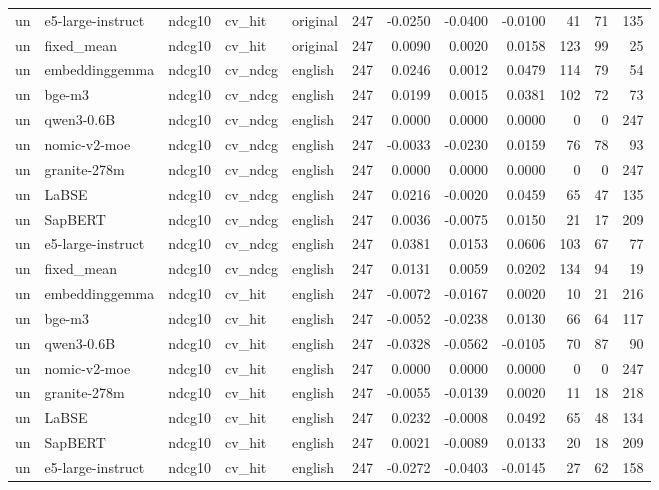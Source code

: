 \begin{tabular}{lllllrrrrrrr}
un & e5-large-instruct & ndcg10 & cv\_hit & original & 247 & -0.0250 & -0.0400 & -0.0100 & 41 & 71 & 135 \\
un & fixed\_mean & ndcg10 & cv\_hit & original & 247 & 0.0090 & 0.0020 & 0.0158 & 123 & 99 & 25 \\
un & embeddinggemma & ndcg10 & cv\_ndcg & english & 247 & 0.0246 & 0.0012 & 0.0479 & 114 & 79 & 54 \\
un & bge-m3 & ndcg10 & cv\_ndcg & english & 247 & 0.0199 & 0.0015 & 0.0381 & 102 & 72 & 73 \\
un & qwen3-0.6B & ndcg10 & cv\_ndcg & english & 247 & 0.0000 & 0.0000 & 0.0000 & 0 & 0 & 247 \\
un & nomic-v2-moe & ndcg10 & cv\_ndcg & english & 247 & -0.0033 & -0.0230 & 0.0159 & 76 & 78 & 93 \\
un & granite-278m & ndcg10 & cv\_ndcg & english & 247 & 0.0000 & 0.0000 & 0.0000 & 0 & 0 & 247 \\
un & LaBSE & ndcg10 & cv\_ndcg & english & 247 & 0.0216 & -0.0020 & 0.0459 & 65 & 47 & 135 \\
un & SapBERT & ndcg10 & cv\_ndcg & english & 247 & 0.0036 & -0.0075 & 0.0150 & 21 & 17 & 209 \\
un & e5-large-instruct & ndcg10 & cv\_ndcg & english & 247 & 0.0381 & 0.0153 & 0.0606 & 103 & 67 & 77 \\
un & fixed\_mean & ndcg10 & cv\_ndcg & english & 247 & 0.0131 & 0.0059 & 0.0202 & 134 & 94 & 19 \\
un & embeddinggemma & ndcg10 & cv\_hit & english & 247 & -0.0072 & -0.0167 & 0.0020 & 10 & 21 & 216 \\
un & bge-m3 & ndcg10 & cv\_hit & english & 247 & -0.0052 & -0.0238 & 0.0130 & 66 & 64 & 117 \\
un & qwen3-0.6B & ndcg10 & cv\_hit & english & 247 & -0.0328 & -0.0562 & -0.0105 & 70 & 87 & 90 \\
un & nomic-v2-moe & ndcg10 & cv\_hit & english & 247 & 0.0000 & 0.0000 & 0.0000 & 0 & 0 & 247 \\
un & granite-278m & ndcg10 & cv\_hit & english & 247 & -0.0055 & -0.0139 & 0.0020 & 11 & 18 & 218 \\
un & LaBSE & ndcg10 & cv\_hit & english & 247 & 0.0232 & -0.0008 & 0.0492 & 65 & 48 & 134 \\
un & SapBERT & ndcg10 & cv\_hit & english & 247 & 0.0021 & -0.0089 & 0.0133 & 20 & 18 & 209 \\
un & e5-large-instruct & ndcg10 & cv\_hit & english & 247 & -0.0272 & -0.0403 & -0.0145 & 27 & 62 & 158 \\

\end{tabular}
